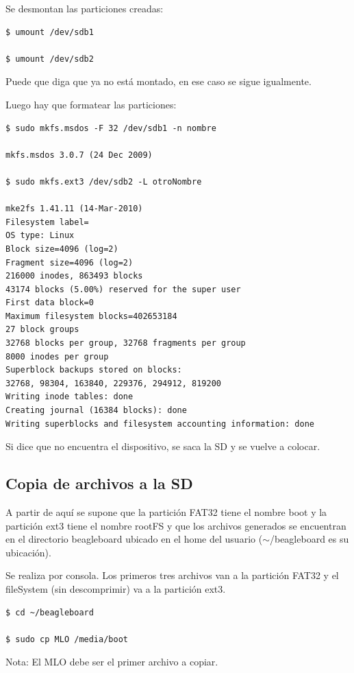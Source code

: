 \newpage
Se desmontan las particiones creadas: 

\begin{verbatim}
$ umount /dev/sdb1

$ umount /dev/sdb2
\end{verbatim}

Puede que diga que ya no está montado, en ese caso se sigue igualmente. 

\bigskip
Luego hay que formatear las particiones: 

\begin{verbatim}
$ sudo mkfs.msdos -F 32 /dev/sdb1 -n nombre

mkfs.msdos 3.0.7 (24 Dec 2009) 

$ sudo mkfs.ext3 /dev/sdb2 -L otroNombre

mke2fs 1.41.11 (14-Mar-2010) 
Filesystem label= 
OS type: Linux 
Block size=4096 (log=2) 
Fragment size=4096 (log=2) 
216000 inodes, 863493 blocks 
43174 blocks (5.00%) reserved for the super user 
First data block=0 
Maximum filesystem blocks=402653184 
27 block groups 
32768 blocks per group, 32768 fragments per group 
8000 inodes per group 
Superblock backups stored on blocks: 
32768, 98304, 163840, 229376, 294912, 819200 
Writing inode tables: done 
Creating journal (16384 blocks): done 
Writing superblocks and filesystem accounting information: done
\end{verbatim}

Si dice que no encuentra el dispositivo, se saca la SD y se vuelve a colocar.

\newpage
\subsection{Copia de archivos a la SD}

A partir de aquí se supone que la partición FAT32 tiene el nombre boot y la partición ext3 tiene el nombre rootFS y que los archivos generados se encuentran en el directorio beagleboard ubicado en el home del usuario ($\sim$/beagleboard es su ubicación).

\bigskip
Se realiza por consola. 
Los primeros tres archivos van a la partición FAT32 y el fileSystem (sin descomprimir) va a la 
partición ext3.

\begin{verbatim}
$ cd ~/beagleboard

$ sudo cp MLO /media/boot
\end{verbatim}

Nota: El MLO debe ser el primer archivo a copiar.

